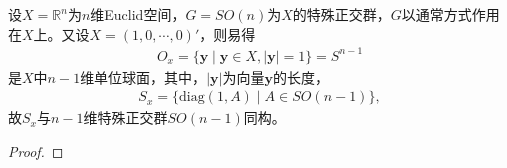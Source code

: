 \documentclass[../../main.tex]{subfiles}%
\begin{document}
\begin{example}
设$X = \mathbb{R}^n$为$n$维Euclid空间，$G = SO(n)$为$X$的特殊正交群，$G$以通常方式作用在$X$上。又设$X = (1, 0, \cdots, 0)'$，则易得
\begin{align*}
O_x = \{\boldsymbol{y} \mid \boldsymbol{y} \in X, |\boldsymbol{y}| = 1\} = S^{n-1}
\end{align*}
是$X$中$n-1$维单位球面，其中，$|\boldsymbol{y}|$为向量$\boldsymbol{y}$的长度，
\begin{align*}
S_x = \{\text{diag}(1, A) \mid A \in SO(n-1)\},
\end{align*}
故$S_x$与$n-1$维特殊正交群$SO(n-1)$同构。
\end{example}
\begin{proof}



\end{proof}
\end{document}
